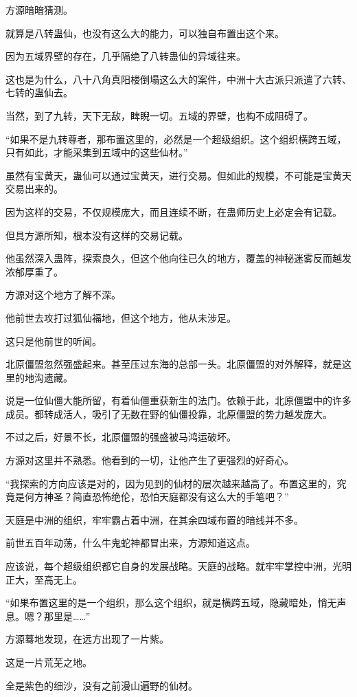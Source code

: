 \begin{this_body}
方源暗暗猜测。

就算是八转蛊仙，也没有这么大的能力，可以独自布置出这个来。

因为五域界壁的存在，几乎隔绝了八转蛊仙的异域往来。

这也是为什么，八十八角真阳楼倒塌这么大的案件，中洲十大古派只派遣了六转、七转的蛊仙去。

当然，到了九转，天下无敌，睥睨一切。五域的界壁，也构不成阻碍了。

“如果不是九转尊者，那布置这里的，必然是一个超级组织。这个组织横跨五域，只有如此，才能采集到五域中的这些仙材。”

虽然有宝黄天，蛊仙可以通过宝黄天，进行交易。但如此的规模，不可能是宝黄天交易出来的。

因为这样的交易，不仅规模庞大，而且连续不断，在蛊师历史上必定会有记载。

但具方源所知，根本没有这样的交易记载。

他虽然深入蛊阵，探索良久，但这个他向往已久的地方，覆盖的神秘迷雾反而越发浓郁厚重了。

方源对这个地方了解不深。

他前世去攻打过狐仙福地，但这个地方，他从未涉足。

这只是他前世的听闻。

北原僵盟忽然强盛起来。甚至压过东海的总部一头。北原僵盟的对外解释，就是这里的地沟遗藏。

说是一位仙僵大能所留，有着仙僵重获新生的法门。依赖于此，北原僵盟中的许多成员。都转成活人，吸引了无数在野的仙僵投靠，北原僵盟的势力越发庞大。

不过之后，好景不长，北原僵盟的强盛被马鸿运破坏。

方源对这里并不熟悉。他看到的一切，让他产生了更强烈的好奇心。

“我探索的方向应该是对的，因为见到的仙材的层次越来越高了。布置这里的，究竟是何方神圣？简直恐怖绝伦，恐怕天庭都没有这么大的手笔吧？”

天庭是中洲的组织，牢牢霸占着中洲，在其余四域布置的暗线并不多。

前世五百年动荡，什么牛鬼蛇神都冒出来，方源知道这点。

应该说，每个超级组织都它自身的发展战略。天庭的战略。就牢牢掌控中洲，光明正大，至高无上。

“如果布置这里的是一个组织，那么这个组织，就是横跨五域，隐藏暗处，悄无声息。嗯？那里是……”

方源蓦地发现，在远方出现了一片紫。

这是一片荒芜之地。

全是紫色的细沙，没有之前漫山遍野的仙材。


\end{this_body}
